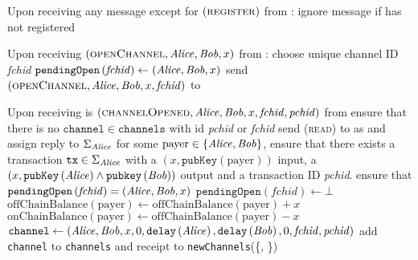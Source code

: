 \begin{functionality}{\fpaynet}
\begin{algorithmic}[1]
    \State Upon receiving any message except for
    $\left(\textsc{register}\right)$ from \alice:
    \Indent
      \State ignore message if \alice has not registered
    \EndIndent
    \State

    \State Upon receiving $\left(\textsc{openChannel}, \mathit{Alice}, \mathit{Bob}, x\right)$
    from \alice:
    \Indent
      \State choose unique channel ID \textit{fchid}
      \State $\mathtt{pendingOpen}\left(\mathit{fchid}\right) \gets
      \left(\mathit{Alice}, \mathit{Bob}, x\right)$
      \State send $\left(\textsc{openChannel}, \mathit{Alice}, \mathit{Bob}, x,
      \mathit{fchid}\right)$ to \simulator
    \EndIndent
    \State

    \State Upon receiving is $\left(\textsc{channelOpened}, \mathit{Alice}, \mathit{Bob}, x,
    \mathit{fchid}, \mathit{pchid}\right)$ from \simulator
    \Indent
      \State ensure that there is no $\mathtt{channel} \in \mathtt{channels}$
      with id \textit{pchid} or \textit{fchid}
      \State send (\textsc{read}) to \ledger{} as \alice{} and assign reply to
      $\Sigma_{\mathit{Alice}}$
      \State for some $\mathrm{payer} \in \left\{\mathit{Alice}, \mathit{Bob}\right\}$, ensure
      that there exists a transaction $\mathtt{tx} \in \Sigma_{\mathit{Alice}}$ with a
      $\left(x, \mathtt{pubKey}\left(\mathrm{payer}\right)\right)$ input, a
      $\left(x, \mathtt{pubKey}\left(\mathit{Alice}\right) \wedge
      \mathtt{pubkey}\left(\mathit{Bob}\right)\right)$ output and a transaction ID
      \textit{pchid}.
       
        \State ensure that $\mathtt{pendingOpen}\left(\mathit{fchid}\right)
        = \left(\mathit{Alice}, \mathit{Bob}, x\right)$
        \State $\mathtt{pendingOpen}\left(\mathit{fchid}\right) \gets \bot$
      \EndIf
      \State $\mathrm{offChainBalance}\left(\mathrm{payer}\right) \gets
      \mathrm{offChainBalance}\left(\mathrm{payer}\right) + x$ 
      \State $\mathrm{onChainBalance}\left(\mathrm{payer}\right) \gets
      \mathrm{offChainBalance}\left(\mathrm{payer}\right) - x$ 
      \State $\mathtt{channel} \gets \left(\mathit{Alice}, \mathit{Bob}, x, 0,
      \mathtt{delay}\left(\mathit{Alice}\right), \mathtt{delay}\left(\mathit{Bob}\right), 0,
      \mathit{fchid}, \mathit{pchid}\right)$
      \State add \texttt{channel} to \texttt{channels} and receipt to
      \texttt{newChannels}(\{\alice, \bob\})
    \EndIndent
    \State


\end{algorithmic}
\end{functionality}
